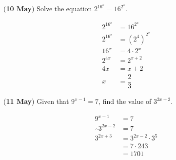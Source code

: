 \documentclass[12pt, answers]{exam} %
\renewcommand{\frac}[2]{\dfrac{#1}{#2}}
\begin{document}
\begin{questions}

	\question (\textbf{10 May}) Solve the equation \(2^{16^{x}} = 16^{2^{x}}\).
	\begin{solution}
		\begin{align*}
			2^{16^{x}} & = 16^{2^{x}}                 \\
			2^{16^{x}} & = \left(2^{4}\right)^{2^{x}} \\
			16^{x}     & = 4 \cdot 2^{x}              \\
			2^{4x}     & = 2^{x + 2}                  \\
			4x         & = x + 2                      \\
			x          & = \frac{2}{3}
		\end{align*}
	\end{solution}

	\question (\textbf{11 May}) Given that \(9^{x-1} = 7\), find the value of \(3^{2x+3}\).
	\begin{solution}
		\begin{align*}
			9^{x - 1}             & = 7                      \\
			\therefore 3^{2x - 2} & = 7                      \\
			3^{2x+3}              & = 3^{2x - 2} \cdot 3^{5} \\
			                      & = 7 \cdot 243            \\
			                      & = 1701
		\end{align*}
	\end{solution}


\end{questions}
\end{document}
